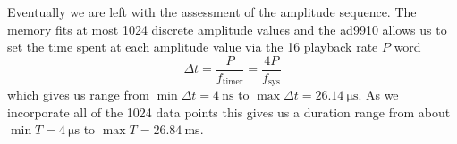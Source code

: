 Eventually we are left with the assessment of the amplitude sequence. The
memory fits at most 1024 discrete amplitude values and the \gls{ad9910}
allows us to set the time spent at each amplitude value via the \SI{16}{\bit}
playback rate $P$ word
\begin{equation}
  \Delta t
  =
  \frac{P}{f_\text{timer}}
  =
  \frac{4P}{f_\text{sys}}
\end{equation}
which gives us range from $\min\Delta t=\SI{4}{\nano\second}$ to
$\max\Delta t=\SI{26.14}{\micro\second}$. As we incorporate all of the 1024
data points this gives us a duration range from about
$\min T=\SI{4}{\micro\second}$ to $\max T=\SI{26.84}{\milli\second}$.

